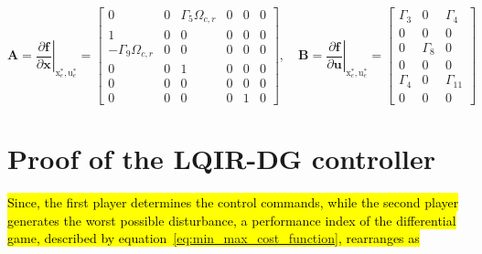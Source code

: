 \documentclass[3p]{elsarticle}
\begin{document}
\begin{equation}
    \mathbf{A} = \left.\dfrac{\partial \mathbf{f}}{\partial \mathbf{x}}\right|_{\boldsymbol{{\mathrm{x}}}_e^*, \boldsymbol{{\mathrm{u}}}_e^*} = \begin{bmatrix}
        0 & 0 & \Gamma_5 \Omega_{c, r} & 0 & 0 & 0 \\
        1 & 0 & 0 & 0 & 0 & 0 \\
        -\Gamma_9 \Omega_{c, r} & 0 & 0 & 0 & 0 & 0 \\
        0 & 0 & 1 & 0 & 0 & 0 \\
        0 & 0 & 0 & 0 & 0 & 0 \\
        0 & 0 & 0 & 0 & 1 & 0
    \end{bmatrix}, \quad \mathbf{B} = \left.\dfrac{\partial \mathbf{f}}{\partial \mathbf{u}}\right|_{\boldsymbol{{\mathrm{x}}}_e^*, \boldsymbol{{\mathrm{u}}}_e^*} = 
    \begin{bmatrix}
       \Gamma_3 & 0 & \Gamma_4\\
       0 & 0 & 0 \\
       0 & \Gamma_8 & 0 \\
       0 & 0 & 0 \\
       \Gamma_4 & 0 & \Gamma_{11} \\
       0 & 0 & 0
   \end{bmatrix}
\end{equation}




\section{Proof of the LQIR-DG controller}
\hl{Since, the first player determines the control commands, while the second player generates the worst possible disturbance, a performance index of the differential game, described by equation~{\eqref{eq:min_max_cost_function}}, rearranges as}
\end{document}
